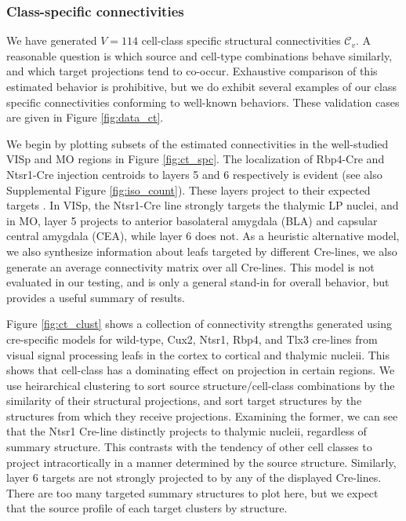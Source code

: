 \newpage
\subsubsection{Class-specific connectivities}

We have generated $V = 114$ cell-class specific structural connectivities $\mathcal C_v$.
A reasonable question is which source and cell-type combinations behave similarly, and which target projections tend to co-occur. 
Exhaustive comparison of this estimated behavior is prohibitive, but we do exhibit several examples of our class specific connectivities conforming to well-known behaviors.
These validation cases are given in Figure \ref{fig:data_ct}.

We begin by plotting subsets of the estimated connectivities in the well-studied VISp and MO regions in Figure \ref{fig:ct_spc}.
The localization of Rbp4-Cre and Ntsr1-Cre injection centroids to layers 5 and 6 respectively is evident (see also Supplemental Figure \ref{fig:iso_count}). 
These layers project to their expected targets \citet{Jeong2016-dc}.
In VISp, the Ntsr1-Cre line strongly targets the thalymic LP nuclei, and in MO, layer 5 projects to anterior basolateral amygdala (BLA) and capsular central amygdala (CEA), while layer 6 does not.
As a heuristic alternative model, we also synthesize information about leafs targeted by different Cre-lines, we also generate an average connectivity matrix over all Cre-lines.
This model is not evaluated in our testing, and is only a general stand-in for overall behavior, but provides a useful summary of results.

Figure \ref{fig:ct_clust} shows a collection of connectivity strengths generated using cre-specific models for wild-type, Cux2, Ntsr1, Rbp4, and Tlx3 cre-lines from visual signal processing leafs in the cortex to cortical and thalymic nucleii.
This shows that cell-class has a dominating effect on projection in certain regions.
We use heirarchical clustering to sort source structure/cell-class combinations by the similarity of their structural projections, and sort target structures by the structures from which they receive projections.
Examining the former, we can see that the Ntsr1 Cre-line distinctly projects to thalymic nucleii, regardless of summary structure.
This contrasts with the tendency of other cell classes to project intracortically in a manner determined by the source structure.
Similarly, layer 6 targets are not strongly projected to by any of the displayed Cre-lines.
There are too many targeted summary structures to plot here, but we expect that the source profile of each target clusters by structure.

